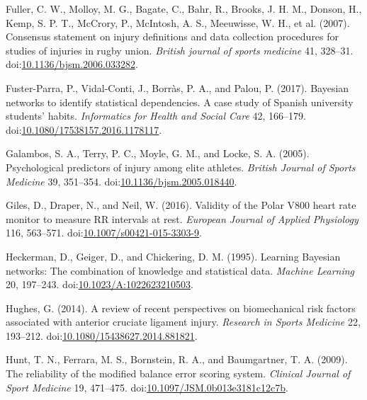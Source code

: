 \documentclass[utf8]{frontiersHLTH}
\begin{document}
\leavevmode\hypertarget{ref-Fuller2007b}{}%
Fuller, C. W., Molloy, M. G., Bagate, C., Bahr, R., Brooks, J. H. M.,
Donson, H., Kemp, S. P. T., McCrory, P., McIntosh, A. S., Meeuwisse, W.
H., et al. (2007). Consensus statement on injury definitions and data
collection procedures for studies of injuries in rugby union.
\emph{British journal of sports medicine} 41, 328--31.
doi:\href{https://doi.org/10.1136/bjsm.2006.033282}{10.1136/bjsm.2006.033282}.

\leavevmode\hypertarget{ref-Fuster-Parra2017}{}%
Fuster-Parra, P., Vidal-Conti, J., Borràs, P. A., and Palou, P. (2017).
Bayesian networks to identify statistical dependencies. A case study of
Spanish university students' habits. \emph{Informatics for Health and
Social Care} 42, 166--179.
doi:\href{https://doi.org/10.1080/17538157.2016.1178117}{10.1080/17538157.2016.1178117}.

\leavevmode\hypertarget{ref-Galambos2005}{}%
Galambos, S. A., Terry, P. C., Moyle, G. M., and Locke, S. A. (2005).
Psychological predictors of injury among elite athletes. \emph{British
Journal of Sports Medicine} 39, 351--354.
doi:\href{https://doi.org/10.1136/bjsm.2005.018440}{10.1136/bjsm.2005.018440}.

\leavevmode\hypertarget{ref-Giles2016}{}%
Giles, D., Draper, N., and Neil, W. (2016). Validity of the Polar V800
heart rate monitor to measure RR intervals at rest. \emph{European
Journal of Applied Physiology} 116, 563--571.
doi:\href{https://doi.org/10.1007/s00421-015-3303-9}{10.1007/s00421-015-3303-9}.

\leavevmode\hypertarget{ref-Heckerman1995}{}%
Heckerman, D., Geiger, D., and Chickering, D. M. (1995). Learning
Bayesian networks: The combination of knowledge and statistical data.
\emph{Machine Learning} 20, 197--243.
doi:\href{https://doi.org/10.1023/A:1022623210503}{10.1023/A:1022623210503}.

\leavevmode\hypertarget{ref-Hughes2014}{}%
Hughes, G. (2014). A review of recent perspectives on biomechanical risk
factors associated with anterior cruciate ligament injury.
\emph{Research in Sports Medicine} 22, 193--212.
doi:\href{https://doi.org/10.1080/15438627.2014.881821}{10.1080/15438627.2014.881821}.

\leavevmode\hypertarget{ref-Hunt2009}{}%
Hunt, T. N., Ferrara, M. S., Bornstein, R. A., and Baumgartner, T. A.
(2009). The reliability of the modified balance error scoring system.
\emph{Clinical Journal of Sport Medicine} 19, 471--475.
doi:\href{https://doi.org/10.1097/JSM.0b013e3181c12c7b}{10.1097/JSM.0b013e3181c12c7b}.
\end{document}
